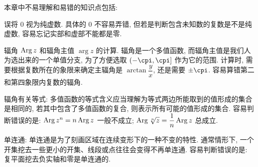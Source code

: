 本章中不易理解和易错的知识点包括:
\begin{enuma}
  \item 误将 $0$ 视为纯虚数. 具体的 $0$ 不容易弄错, 但若是判断包含未知数的复数是不是纯虚数, 容易忘记实部和虚部不能都是零.
  \item 辐角 $\operatorname{Arg} z$ 和辐角主值 $\arg z$ 的计算. 辐角是一个多值函数, 而辐角主值是我们人为选出来的一个单值分支, 为了方便选取 $(-\cpi,\cpi]$ 作为它的范围. 计算时, 需要根据复数所在的象限来确定主辐角是 $\arctan\dfrac yx$, 还是需要 $\pm\cpi$. 
  容易算错第二和第四象限内复数的辐角.
  \item 辐角有关等式: 多值函数的等式含义应当理解为等式两边所能取到的值形成的集合是相同的, 若其中包含了多值函数的复合, 则表示所有可能的值形成的集合.
  容易判断错误的是: $\operatorname{Arg} z^n=n\operatorname{Arg} z$ 一般不成立; $\operatorname{Arg} \sqrt[n]z=\dfrac1n\operatorname{Arg} z$ 总成立.
  \item 单连通: 单连通是为了刻画区域在连续变形下的一种不变的特性. 通常情形下, 一个开集挖去一些更小的开集、线段或点往往会变得不再单连通.
  容易判断错误的是: 复平面挖去负实轴和零是单连通的.
\end{enuma}




